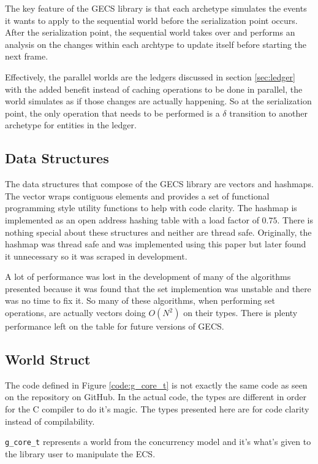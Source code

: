 The key feature of the GECS library is that each archetype simulates the events it wants to apply to the sequential world before the serialization point occurs. After the serialization point, the sequential world takes over and performs an analysis on the changes within each archtype to update itself before starting the next frame.

Effectively, the parallel worlds are the ledgers discussed in section \ref{sec:ledger} with the added benefit instead of caching operations to be done in parallel, the world simulates as if those changes are actually happening. So at the serialization point, the only operation that needs to be performed is a $\delta$ transition to another archetype for entities in the ledger.

\subsection{Data Structures}
\label{sec:ds}
The data structures that compose of the GECS library are vectors and hashmaps. The vector wraps contiguous elements and provides a set of functional programming style utility functions to help with code clarity. The hashmap is implemented as an open address hashing table with a load factor of $0.75$. There is nothing special about these structures and neither are thread safe. Originally, the hashmap was thread safe and was implemented using this paper \cite{hashmaps} but later found it unnecessary so it was scraped in development. 

A lot of performance was lost in the development of many of the algorithms presented because it was found that the set implemention was unstable and there was no time to fix it. So many of these algorithms, when performing set operations, are actually vectors doing $O(N^2)$ on their types. There is plenty performance left on the table for future versions of GECS.

\subsection{World Struct}
The code defined in Figure \ref{code:g_core_t} is not exactly the same code as seen on the repository on GitHub. In the actual code, the types are different in order for the C compiler to do it's magic. The types presented here are for code clarity instead of compilability.

\texttt{g\_core\_t} represents a world from the concurrency model and it's what's given to the library user to manipulate the ECS.


